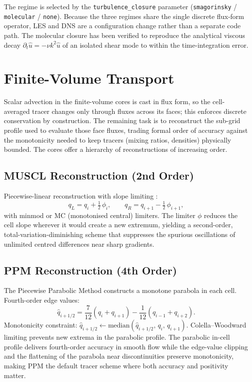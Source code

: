 \documentclass[11pt,twoside]{report}
\newcommand{\half}{\tfrac{1}{2}}
\begin{document}
The regime is selected by the \texttt{turbulence\_closure} parameter
(\texttt{smagorinsky} / \texttt{molecular} / \texttt{none}).  Because the
three regimes share the single discrete flux-form operator, LES and DNS are
a configuration change rather than a separate code path.  The molecular
closure has been verified to reproduce the analytical viscous decay
$\partial_t\hat u = -\nu k^2\hat u$ of an isolated shear mode to within the
time-integration error.


\section{Finite-Volume Transport}
\label{sec:fv-transport}

Scalar advection in the finite-volume cores is cast in flux form, so the
cell-averaged tracer changes only through fluxes across its faces; this enforces
discrete conservation by construction. The remaining task is to reconstruct the
sub-grid profile used to evaluate those face fluxes, trading formal order of
accuracy against the monotonicity needed to keep tracers (mixing ratios,
densities) physically bounded. The cores offer a hierarchy of reconstructions of
increasing order.

\subsection{MUSCL Reconstruction (2nd Order)}

Piecewise-linear reconstruction with slope limiting \citep{vanLeer1979}:
\begin{equation}
  q_L = q_i + \half\,\phi_i, \qquad q_R = q_{i+1} - \half\,\phi_{i+1},
\end{equation}
with minmod or MC (monotonised central) limiters. The limiter $\phi$ reduces the
cell slope wherever it would create a new extremum, yielding a second-order,
total-variation-diminishing scheme that suppresses the spurious oscillations of
unlimited centred differences near sharp gradients.

\subsection{PPM Reconstruction (4th Order)}

The Piecewise Parabolic Method \citep{ColellaWoodward1984} constructs a
monotone parabola in each cell.  Fourth-order edge values:
\begin{equation}
  \hat q_{i+1/2} = \frac{7}{12}(q_i+q_{i+1})
  - \frac{1}{12}(q_{i-1}+q_{i+2}).
\end{equation}
Monotonicity constraint:
$\hat q_{i+1/2} \leftarrow \mathrm{median}(\hat q_{i+1/2},\,q_i,\,q_{i+1})$.
Colella--Woodward limiting prevents new extrema in the parabolic profile. The
parabolic in-cell profile delivers fourth-order accuracy in smooth flow while
the edge-value clipping and the flattening of the parabola near discontinuities
preserve monotonicity, making PPM the default tracer scheme where both accuracy
and positivity matter.
\end{document}
